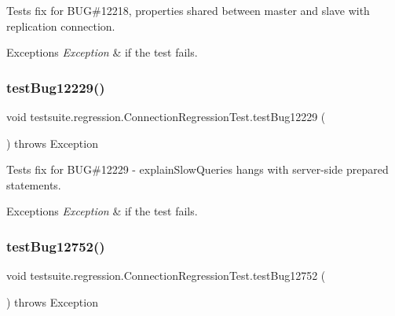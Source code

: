 Tests fix for B\+UG\#12218, properties shared between master and slave with replication connection.


\begin{DoxyExceptions}{Exceptions}
{\em Exception} & if the test fails. \\
\hline
\end{DoxyExceptions}
\mbox{\label{classtestsuite_1_1regression_1_1_connection_regression_test_ae7bb792ec6285364876e5c6c1fe03c9e}} 
\subsubsection{\texorpdfstring{test\+Bug12229()}{testBug12229()}}
{\footnotesize\ttfamily void testsuite.\+regression.\+Connection\+Regression\+Test.\+test\+Bug12229 (\begin{DoxyParamCaption}{ }\end{DoxyParamCaption}) throws Exception}

Tests fix for B\+UG\#12229 -\/ explain\+Slow\+Queries hangs with server-\/side prepared statements.


\begin{DoxyExceptions}{Exceptions}
{\em Exception} & if the test fails. \\
\hline
\end{DoxyExceptions}
\mbox{\label{classtestsuite_1_1regression_1_1_connection_regression_test_a835b955e0018a43040f38a7dff684e0c}} 
\subsubsection{\texorpdfstring{test\+Bug12752()}{testBug12752()}}
{\footnotesize\ttfamily void testsuite.\+regression.\+Connection\+Regression\+Test.\+test\+Bug12752 (\begin{DoxyParamCaption}{ }\end{DoxyParamCaption}) throws Exception}

